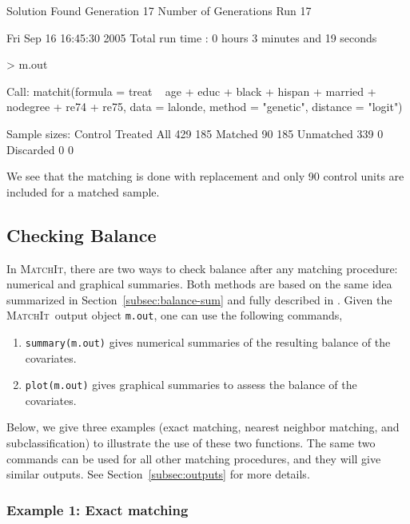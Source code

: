 \documentclass[oneside,letterpaper,titlepage]{article}
\newcommand{\MatchIt}{\textsc{MatchIt}}
\begin{document}
\begin{Schunk}
\begin{Soutput}
Solution Found Generation 17
Number of Generations Run 17


Fri Sep 16 16:45:30 2005
Total run time : 0 hours 3 minutes and 19 seconds
\end{Soutput}
\begin{Sinput}
> m.out
\end{Sinput}
\begin{Soutput}
Call: 
matchit(formula = treat ~ age + educ + black + hispan + married + 
    nodegree + re74 + re75, data = lalonde, method = "genetic", 
    distance = "logit")

Sample sizes:
          Control Treated
All           429     185
Matched        90     185
Unmatched     339       0
Discarded       0       0
\end{Soutput}
\end{Schunk}
We see that the matching is done with replacement and only 90 control
units are included for a matched sample.



\subsection{Checking Balance}
\label{subsec:balance}

In \MatchIt, there are two ways to check balance after any matching
procedure: numerical and graphical summaries. Both methods are based
on the same idea summarized in Section~\ref{subsec:balance-sum} and
fully described in \citet*{HoImaKin05}. Given the \MatchIt\ output
object {\tt m.out}, one can use the following commands,
\begin{enumerate}
\item \texttt{summary(m.out)} gives numerical summaries of the
  resulting balance of the covariates.
  
\item \texttt{plot(m.out)} gives graphical summaries to assess the balance
  of the covariates.
\end{enumerate}
Below, we give three examples (exact matching, nearest neighbor
matching, and subclassification) to illustrate the use of these two
functions. The same two commands can be used for all other matching
procedures, and they will give similar outputs. See
Section~\ref{subsec:outputs} for more details.

\subsubsection{Example 1: Exact matching}
\label{subsubsec:balanceexact}
\end{document}
